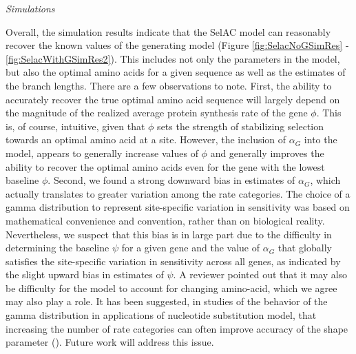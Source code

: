 \documentclass[12pt,letterpaper]{article}
\renewcommand{\subsection}[1]{%
\bigskip
\begin{center}
\begin{large}
\normalfont\itshape #1
\end{large}
\end{center}}
\newcommand{\alphag}{\ensuremath{\alpha_G}\xspace}
\begin{document}
\subsection{Simulations}
Overall, the simulation results indicate that the SelAC model can reasonably recover the known values of the generating model (Figure \ref{fig:SelacNoGSimRes} - \ref{fig:SelacWithGSimRes2}).
This includes not only the parameters in the model, but also the optimal amino acids for a given sequence as well as the estimates of the branch lengths.
There are a few observations to note.
First, the ability to accurately recover the true optimal amino acid sequence will largely depend on the magnitude of the realized average protein synthesis rate of the gene $\phi$.
This is, of course, intuitive, given that $\phi$ sets the strength of stabilizing selection towards an optimal amino acid at a site.
However, the inclusion of $\alphag$ into the model, appears to generally increase values of $\phi$ and generally improves the ability to recover the optimal amino acids even for the gene with the lowest baseline $\phi$.
Second, we found a strong downward bias in estimates of $\alphag$, which actually translates to greater variation among the rate categories.
The choice of a gamma distribution to represent site-specific variation in sensitivity was based on mathematical convenience and convention, rather than on biological reality.
Nevertheless, we suspect that this bias is in large part due to the difficulty in determining the baseline $\psi$ for a given gene and the value of $\alphag$ that globally satisfies the site-specific variation in sensitivity across all genes, as indicated by the slight upward bias in estimates of $\psi$.
A reviewer pointed out that it may also be difficulty for the model to account for changing amino-acid, which we agree may also play a role.
It has been suggested, in studies of the behavior of the gamma distribution in applications of nucleotide substitution model, that increasing the number of rate categories can often improve accuracy of the shape parameter (\citet{MayroseEtAl2005}).
Future work will address this issue.
\end{document}
